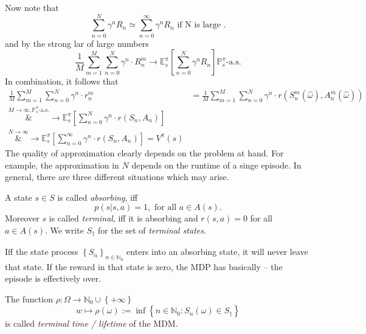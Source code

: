 Now note that 
\[
    \sum_{n=0}^N \gamma^n R_n \simeq \sum_{n=0}^\infty \gamma^n R_n \text{ if N is large }.
\]
and by the strong lar of large numbers
\[
    \frac{1}{M}\sum_{m=1}^M \sum_{n=0}^N \gamma^n \cdot R_n^m \longrightarrow \mathbb{E}_s^\pi \left[ \sum_{n = 0}^N \gamma^n R_n \right] \mathbb{P}_s^\pi \text{-a.s.}
\]
In combination, it follows that
\begin{align*}
    \frac{1}{M} \sum_{ m = 1}^M \sum_{n=0}^N \gamma^n \cdot r_n^m &= \frac{1}{M} \sum_{m=1}^M \sum_{n = 0 }^N \gamma^n \cdot r(S_n^m(\hat{\omega}), A_n^m(\hat{\omega})) \\
    \overset{M \to \infty, \mathbb{P}_s^\pi\text{-a.s.}}&{\longrightarrow} \mathbb{E}_s^\pi \left[  \sum_{n = 0}^N \gamma^n \cdot r(S_n, A_n) \right] \\
    \overset{N \to \infty}&{\longrightarrow} \mathbb{E}_s^\pi \left[  \sum_{n=0}^{\infty} \gamma^n \cdot r(S_n, A_n) \right] = V^\pi(s)
\end{align*}
The quality of approximation clearly depends on the problem at hand. For example, the approximation in \( N \) depends on the runtime of a singe episode.
In general, there are three different situations which may arise.



\begin{definition}
A state \( s \in S \) is called \emph{absorbing}, iff 
\[
    p(s|s,a) = 1, \text{ for all  } a \in A(s).
\] 
Moreover \( s \) is called \emph{terminal}, iff it is absorbing and \( r(s,a) = 0 \) for all \( a \in A(s) \).
We write \( S_\dagger \) for the set of \emph{terminal states}.         

\end{definition}

Iff the state process \( \left\{ S_n \right\}_{n \in \mathbb{N}_{0}} \) enters into an absorbing state, it will never leave that state.
If the reward in that state is zero, the MDP has basically  -- the episode is effectively over.

\begin{definition}
    The function \( \rho: \Omega \to \mathbb{N}_{0} \cup \left\{ +\infty \right\} \)
    \[
        w \mapsto \rho(\omega) := \inf \left\{ n \in \mathbb{N}_{0}: S_n(\omega) \in S_{\dagger} \right\}
    \] 
    is called \emph{terminal time / lifetime} of the MDM.
\end{definition}

